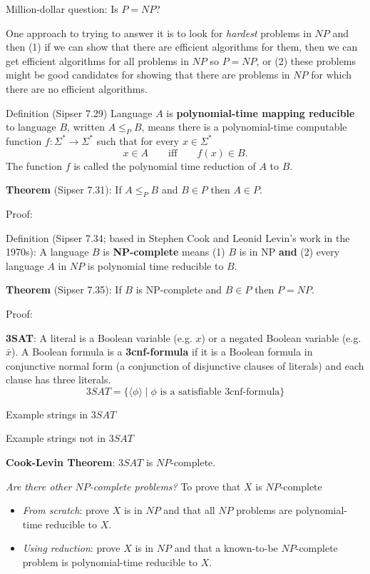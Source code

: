 \documentclass[12pt, oneside]{article}
\begin{document}
\newpage

Million-dollar question: Is $P = NP$?


One approach to trying to answer it is to look for {\it hardest} problems in $NP$ and 
then (1) if we can show that there are efficient algorithms for them, then we can get 
efficient algorithms for all problems in $NP$ so $P = NP$, or (2) these problems might 
be good candidates for showing that there are problems in $NP$ for which there 
are no efficient algorithms.


Definition (Sipser 7.29) Language  $A$ is {\bf polynomial-time mapping reducible} to language $B$, written $A \leq_P B$,
means there is a polynomial-time computable function $f: \Sigma^* \to \Sigma^*$  such that for every $x \in \Sigma^*$
\[
x \in A \qquad \text{iff} \qquad f(x) \in B.
\]
The  function $f$ is  called the  polynomial time reduction of $A$ to $B$.

{\bf  Theorem}  (Sipser 7.31):  If $A \leq_P B$ and $B  \in P$ then $A \in P$.

Proof: 

\vfill

Definition (Sipser 7.34; based in Stephen Cook and Leonid Levin's work in the 1970s): 
A language $B$ is {\bf  NP-complete} means (1) $B$ is in NP {\bf and}  (2) every language
$A$ in $NP$ is polynomial time reducible to $B$.

{\bf  Theorem}  (Sipser 7.35):  If $B$ is NP-complete and $B \in P$ then $P = NP$.

Proof: 

\vfill

\newpage

{\bf 3SAT}: A literal is a Boolean variable (e.g.  $x$) or a negated Boolean variable (e.g.  $\bar{x}$).  
A Boolean formula is a {\bf  3cnf-formula} if it is a Boolean formula in conjunctive normal form (a conjunction  
of  disjunctive clauses of literals) and each clause  has  three literals.
\[
3SAT  = \{  \langle  \phi \rangle \mid \text{$\phi$ is  a  satisfiable 3cnf-formula} \}
\]


Example strings  in $3SAT$


Example  strings not  in $3SAT$




{\bf Cook-Levin Theorem}: $3SAT$ is $NP$-complete.


{\it Are there other $NP$-complete problems?} To prove that $X$ is $NP$-complete
\begin{itemize}
\item {\it From scratch}: prove $X$ is in $NP$ and that all $NP$ problems are polynomial-time
reducible to $X$.
\item {\it Using reduction}: prove $X$ is in $NP$ and that a known-to-be $NP$-complete problem 
is polynomial-time reducible to $X$.
\end{itemize}
\end{document}
